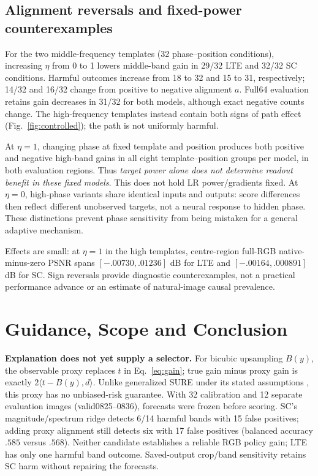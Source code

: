 \subsection{Alignment reversals and fixed-power counterexamples}
For the two middle-frequency templates (32 phase--position conditions),
increasing $\eta$ from 0 to 1 lowers middle-band gain in 29/32 LTE and
32/32 SC conditions. Harmful outcomes increase from 18 to 32 and 15 to
31, respectively; 14/32 and 16/32 change from positive to negative
alignment $a$. Full64 evaluation retains gain decreases in 31/32 for
both models, although exact negative counts change. The high-frequency
templates instead contain both signs of path effect
(Fig.~\ref{fig:controlled}); the path is not uniformly harmful.

At $\eta=1$, changing phase at fixed template and position produces both
positive and negative high-band gains in all eight template--position
groups per model, in both evaluation regions. Thus \emph{target power
alone does not determine readout benefit in these fixed models}.
This does not hold LR power/gradients fixed. At $\eta=0$, high-phase
variants share identical inputs and outputs: score differences then
reflect different unobserved targets, not a neural response to hidden
phase. These distinctions prevent phase sensitivity from being mistaken
for a general adaptive mechanism.

Effects are small: at $\eta=1$ in the high templates, centre-region
full-RGB native-minus-zero PSNR spans $[-.00730,.01236]$ dB for LTE and
$[-.00164,.000891]$ dB for SC. Sign reversals provide diagnostic
counterexamples, not a practical performance advance or an estimate
of natural-image causal prevalence.

\section{Guidance, Scope and Conclusion}
\label{sec:limits}
\textbf{Explanation does not yet supply a selector.}
For bicubic upsampling $B(y)$, the observable proxy replaces $t$ in
Eq.~\eqref{eq:gain}; true gain minus proxy gain is exactly
$2\langle t-B(y),d\rangle$. Unlike generalized SURE under its stated
assumptions \cite{eldar2008gsure}, this proxy has no unbiased-risk guarantee.
With 32 calibration and 12 separate evaluation images (valid0825--0836),
forecasts were frozen before scoring. SC's magnitude/spectrum ridge
detects 6/14 harmful bands with 15 false positives; adding proxy alignment
still detects six with 17 false positives (balanced accuracy $.585$
versus $.568$). Neither candidate establishes a reliable RGB policy gain;
LTE has only one harmful band outcome. Saved-output crop/band sensitivity
retains SC harm without repairing the forecasts.

